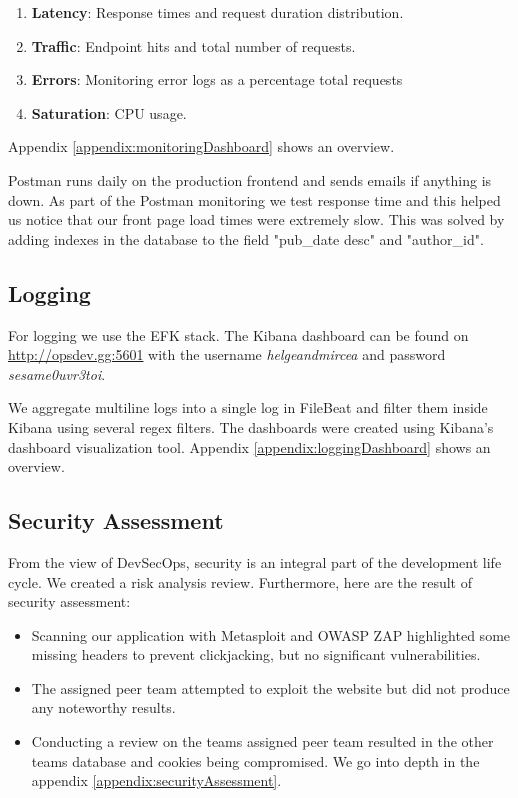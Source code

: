 \documentclass{article}
\begin{document}
\begin{enumerate}
    \item \textbf{Latency}: Response times and request duration distribution.
    \item \textbf{Traffic}: Endpoint hits and total number of requests.
    \item \textbf{Errors}: Monitoring error logs as a percentage total requests
    \item \textbf{Saturation}: CPU usage.
\end{enumerate}
Appendix \ref{appendix:monitoringDashboard} shows an overview. 
\newline

Postman runs daily on the production frontend and sends emails if anything is down. As part of the Postman monitoring we test response time and this helped us notice that our front page load times were extremely slow. This was solved by adding indexes in the database to the field "pub\_date desc" and "author\_id". 

\subsection{Logging}

For logging we use the EFK stack. The Kibana dashboard can be found on \url{http://opsdev.gg:5601} with the username \emph{helgeandmircea} and password \emph{sesame0uvr3toi}. 

We aggregate multiline logs into a single log in FileBeat and filter them inside Kibana using several regex filters. The dashboards were created using Kibana's dashboard visualization tool. Appendix \ref{appendix:loggingDashboard} shows an overview.


\subsection{Security Assessment}

From the view of DevSecOps, security is an integral part of the development life cycle. We created a risk analysis review. Furthermore, here are the result of security assessment: 

\begin{itemize}
    \item Scanning our application with Metasploit and OWASP ZAP highlighted some missing headers to prevent clickjacking, but no significant vulnerabilities. 
    \item The assigned peer team attempted to exploit the website but did not produce any noteworthy results. 
    \item Conducting a review on the teams assigned peer team resulted in the other teams database and cookies being compromised. We go into depth in the appendix \ref{appendix:securityAssessment}.
\end{itemize}
\end{document}
